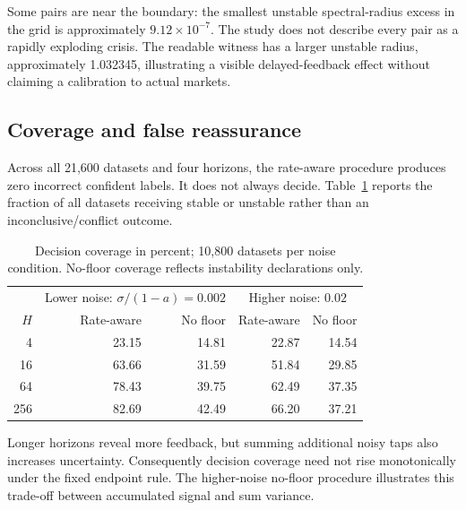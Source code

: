 \documentclass[11pt]{article}
\theoremstyle{remark}\newtheorem{remark}[theorem]{Remark}
\begin{document}
Some pairs are near the boundary: the smallest unstable spectral-radius excess in the grid is approximately $9.12\times10^{-7}$. The study does not describe every pair as a rapidly exploding crisis. The readable witness has a larger unstable radius, approximately 1.032345, illustrating a visible delayed-feedback effect without claiming a calibration to actual markets.

\subsection{Coverage and false reassurance}
Across all 21,600 datasets and four horizons, the rate-aware procedure produces zero incorrect confident labels. It does not always decide. Table~\ref{tab:coverage} reports the fraction of all datasets receiving stable or unstable rather than an inconclusive/conflict outcome.
\begin{table}[ht]
\centering\small
\begin{tabular}{rrrrr}
\toprule &\multicolumn{2}{c}{Lower noise: $\sigma/(1-a)=0.002$}&\multicolumn{2}{c}{Higher noise: $0.02$}\\
$H$&Rate-aware&No floor&Rate-aware&No floor\\\midrule
4 & 23.15 & 14.81 & 22.87 & 14.54 \\
16 & 63.66 & 31.59 & 51.84 & 29.85 \\
64 & 78.43 & 39.75 & 62.49 & 37.35 \\
256 & 82.69 & 42.49 & 66.20 & 37.21 \\
\bottomrule
\end{tabular}
\caption{Decision coverage in percent; 10,800 datasets per noise condition. No-floor coverage reflects instability declarations only.}\label{tab:coverage}
\end{table}
Longer horizons reveal more feedback, but summing additional noisy taps also increases uncertainty. Consequently decision coverage need not rise monotonically under the fixed endpoint rule. The higher-noise no-floor procedure illustrates this trade-off between accumulated signal and sum variance.
\end{document}

